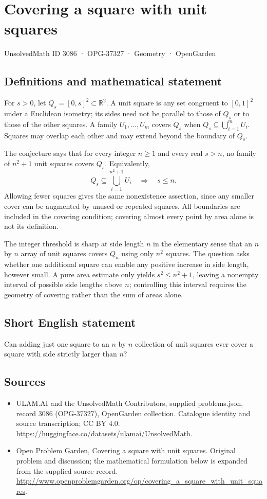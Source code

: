 \documentclass[11pt,a4paper]{article}
\begin{document}
\section*{Covering a square with unit squares}\label{3086}
{\small UnsolvedMath ID 3086 · OPG-37327 · Geometry · OpenGarden}
\subsection{Definitions and mathematical statement}
For $s>0$, let $Q_s=[0,s]^2\subset\mathbb R^2$.
A unit square is any set congruent to $[0,1]^2$ under a Euclidean isometry;
its sides need not be parallel to those of $Q_s$ or to those of the
other squares. A family $U_1,\ldots,U_m$ covers $Q_s$ when
$Q_s\subseteq\bigcup_{i=1}^m U_i$. Squares may overlap each other and
may extend beyond the boundary of $Q_s$.

The conjecture says that for every integer $n\ge1$ and every real
$s>n$, no family of $n^2+1$ unit squares covers $Q_s$. Equivalently,
\[
 Q_s\subseteq\bigcup_{i=1}^{n^2+1}U_i
       \quad\Longrightarrow\quad s\le n.
\]
Allowing fewer squares gives the same nonexistence assertion, since any
smaller cover can be augmented by unused or repeated squares. All boundaries
are included in the covering condition; covering almost every point by
area alone is not its definition.

The integer threshold is sharp at side length $n$ in the elementary
sense that an $n$ by $n$ array of unit squares covers $Q_n$ using only
$n^2$ squares. The question asks whether one additional square can enable
any positive increase in side length, however small. A pure area estimate
only yields $s^2\le n^2+1$, leaving a nonempty interval of possible side
lengths above $n$; controlling this interval requires the geometry of
covering rather than the sum of areas alone.
\subsection{Short English statement}
Can adding just one square to an $n$ by $n$ collection of unit squares ever cover a square with side strictly larger than $n$?
\subsection{Sources}
\begin{itemize}
\item[S1] ULAM.AI and the UnsolvedMath Contributors, supplied problems.json, record 3086 (OPG-37327), OpenGarden collection. Catalogue identity and source transcription; CC BY 4.0.
\url{https://huggingface.co/datasets/ulamai/UnsolvedMath}.
\item[S2] Open Problem Garden, Covering a square with unit squares. Original problem and discussion; the mathematical formulation below is expanded from the supplied source record.
\url{http://www.openproblemgarden.org/op/covering_a_square_with_unit_squares}.
\end{itemize}
\end{document}

